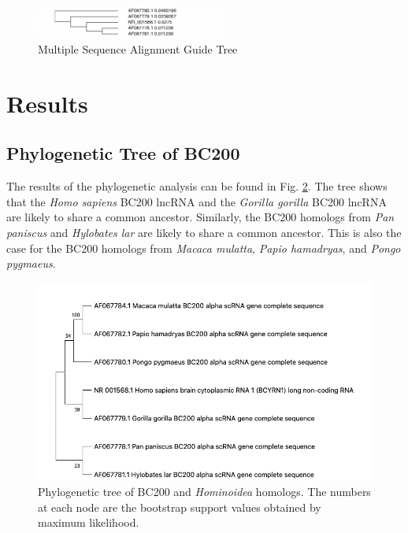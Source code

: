 \documentclass[conference, 11pt]{IEEEtran}
\begin{document}
\begin{figure}[ht]
  \centering
  \includegraphics[width=0.55\textwidth]{figs/guidetree.png}
  \caption{Multiple Sequence Alignment Guide Tree}
  \label{fig:Guide-tree}
\end{figure}

\section{Results}\label{sec:results}

\subsection{Phylogenetic Tree of BC200}

The results of the phylogenetic analysis can be found in Fig. \ref{fig:phylo-tree}. 
The tree shows that the \emph{Homo sapiens} BC200 lncRNA and the \emph{Gorilla gorilla} BC200 lncRNA are likely to share a common ancestor. 
Similarly, the BC200 homologs from \emph{Pan paniscus} and \emph{Hylobates lar} are likely to share a common ancestor. 
This is also the case for the BC200 homologs from \emph{Macaca mulatta}, \emph{Papio hamadryas}, and \emph{Pongo pygmaeus}. 

\begin{figure}[ht]
  \centering
  \includegraphics[width=\columnwidth, keepaspectratio]{figs/phylogenetic-tree.jpg}
  \caption{Phylogenetic tree of BC200 and \emph{Hominoidea} homologs. The numbers at each node are the bootstrap support values obtained by maximum likelihood.}
  \label{fig:phylo-tree}
\end{figure}
\end{document}
